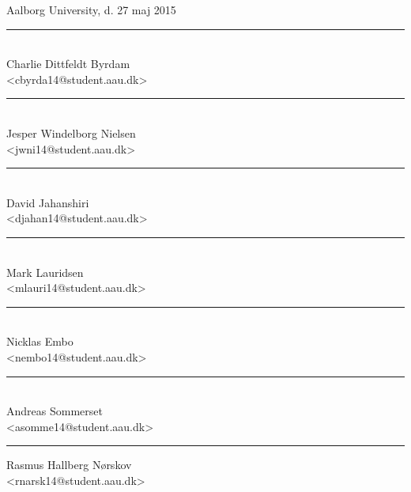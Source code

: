 \vspace{\baselineskip}\hfill Aalborg University, d. 27 maj 2015
\vfill\noindent
\begin{minipage}[b]{0.45\textwidth}
 \centering
 \rule{\textwidth}{0.5pt}\\
  Charlie Dittfeldt Byrdam\\
 {\footnotesize <cbyrda14@student.aau.dk>}
\end{minipage}
\hfill
\vspace{3\baselineskip}
\begin{minipage}[b]{0.45\textwidth}
 \centering
 \rule{\textwidth}{0.5pt}\\
  Jesper Windelborg Nielsen\\
 {\footnotesize <jwni14@student.aau.dk>}
\end{minipage}
\hfill
\vspace{3\baselineskip}
\begin{minipage}[b]{0.45\textwidth}
 \centering
 \rule{\textwidth}{0.5pt}\\
  David Jahanshiri\\
 {\footnotesize <djahan14@student.aau.dk>}
\end{minipage}
\hfill
\begin{minipage}[b]{0.45\textwidth}
 \centering
 \rule{\textwidth}{0.5pt}\\
  Mark Lauridsen\\
 {\footnotesize <mlauri14@student.aau.dk>}
\end{minipage}
\hfill
\vspace{3\baselineskip}
\begin{minipage}[b]{0.45\textwidth}
 \centering
 \rule{\textwidth}{0.5pt}\\
  Nicklas Embo\\
 {\footnotesize <nembo14@student.aau.dk>}
\end{minipage}
\hfill
\begin{minipage}[b]{0.45\textwidth}
 \centering
 \rule{\textwidth}{0.5pt}\\
  Andreas Sommerset\\
 {\footnotesize <asomme14@student.aau.dk>}
\end{minipage}
\hfill
\vspace{3\baselineskip}
\begin{center}
\begin{minipage}[b]{0.45\textwidth}
 \centering
 \rule{\textwidth}{0.5pt}
  Rasmus Hallberg Nørskov\\
 {\footnotesize <rnarsk14@student.aau.dk>}
\end{minipage}
\end{center}